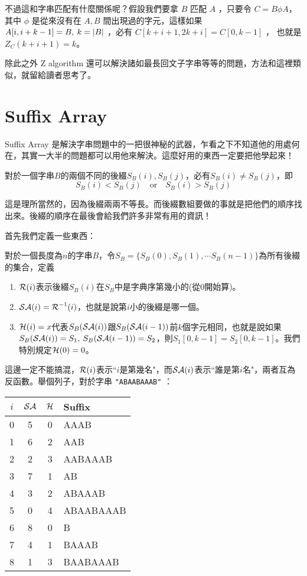 \documentclass[a4paper,12pt]{book}
\begin{document}
不過這和字串匹配有什麼關係呢？假設我們要拿 $B$ 匹配 $A$ ，只要令 $C = B \phi A$，其中 $\phi$ 是從來沒有在 $A, B$ 間出現過的字元，這樣如果 $A[i, i+k-1] = B, \: k = \lvert B \rvert$ ，必有 $C[k+i+1, 2k+i] = C[0, k-1]$ ， 也就是
$ Z_C(k+i+1) = k $。

除此之外 Z algorithm 還可以解決諸如最長回文子字串等等的問題，方法和這裡類似，就留給讀者思考了。
\section{Suffix Array}
Suffix Array 是解決字串問題中的一把很神秘的武器，乍看之下不知道他的用處何在，其實一大半的問題都可以用他來解決。這麼好用的東西一定要把他學起來！\\

\begin{theorem}[定理]
  對於一個字串$B$的兩個不同的後綴$S_B(i), S_B(j)$，必有$S_B(i) \neq S_B(j)$，即
  \[ 
    S_B(i) < S_B(j) \quad \text{or} \quad S_B(i) > S_B(j)
  \]
\end{theorem}
這是理所當然的，因為後綴兩兩不等長。而後綴數組要做的事就是把他們的順序找出來。後綴的順序在最後會給我們許多非常有用的資訊！

首先我們定義一些東西：
\begin{theorem}[定義]
  對於一個長度為$n$的字串$B$，令$S_B = \{ S_B(0), S_B(1), \cdots S_B(n-1)\}$為所有後綴的集合，定義
  \begin{enumerate}
    \item $\operatorname{\mathcal{R}}(i)$表示後綴$S_B(i)$在$S_B$中是字典序第幾小的(從$0$開始算)。
    \item $\operatorname{\mathcal{SA}}(i) = \operatorname{\mathcal{R}}^{-1}(i)$，也就是說第$i$小的後綴是哪一個。
    \item $\operatorname{\mathcal{H}}(i) = x$代表$S_{B}(\operatorname{\mathcal{SA}}(i))$跟$S_{B}(\operatorname{\mathcal{SA}}(i-1))$前$k$個字元相同，也就是說如果$S_{B}(\operatorname{\mathcal{SA}}(i)) = S_1, \: S_{B}(\operatorname{\mathcal{SA}}(i-1)) = S_2$，則$S_1[0, k-1] = S_2[0, k-1]$。我們特別規定$\operatorname{\mathcal{H}}(0) = 0$。
  \end{enumerate}
\end{theorem}
這邊一定不能搞混，$\operatorname{\mathcal{R}}(i)$表示``$i$是第幾名"，而$\operatorname{\mathcal{SA}}(i)$表示``誰是第$i$名"，兩者互為反函數。舉個列子，對於字串 \texttt{"ABAABAAAB"} ：
\begin{center}
\begin{tabular}{c|c|c|l}
  $i$ & $\operatorname{\mathcal{SA}}$ & $\operatorname{\mathcal{H}}$ & Suffix \\\hline
  0 & 5 & 0 & AAAB \\
  1 & 6 & 2 & AAB \\
  2 & 2 & 3 & AABAAAB \\
  3 & 7 & 1 & AB \\
  4 & 3 & 2 & ABAAAB \\
  5 & 0 & 4 & ABAABAAAB \\
  6 & 8 & 0 & B \\
  7 & 4 & 1 & BAAAB \\
  8 & 1 & 3 & BAABAAAB
\end{tabular}
\end{center}
\end{document}
